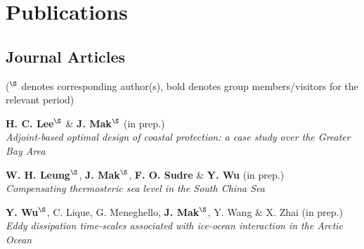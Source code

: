 \documentclass[letterpaper]{article}
\renewenvironment{itemize}{
  \begin{list}{}{
    \setlength{\leftmargin}{1.5em}
  }
}{
  \end{list}
}
\begin{document}
\section*{Publications}
\subsection*{Journal Articles}

(${}^\S$ denotes corresponding author(s), bold denotes group members/visitors for the relevant period)

\begin{itemize}




\item[*] \textbf{H. C. Lee}$^{\S}$ \& \textbf{J. Mak}$^{\S}$ (in prep.)\\
\textit{Adjoint-based optimal design of coastal protection: a case study over the Greater Bay Area}

\item[*] \textbf{W. H. Leung}$^{\S}$, \textbf{J. Mak}$^{\S}$, \textbf{F. O. Sudre} \& \textbf{Y. Wu} (in prep.)\\
\textit{Compensating thermosteric sea level in the South China Sea}

\item[*] \textbf{Y. Wu}$^{\S}$, C. Lique, G. Meneghello, \textbf{J. Mak}$^{\S}$, Y. Wang \& X. Zhai (in prep.)\\
\textit{Eddy dissipation time-scales associated with ice-ocean interaction in the Arctic Ocean}


\end{itemize}
\end{document}
